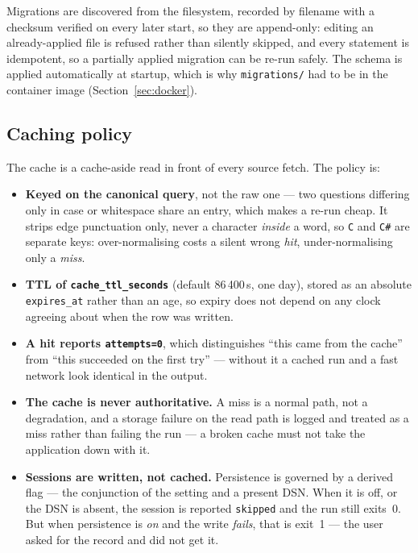 \documentclass[10pt,a4paper]{article}
\begin{document}
Migrations are discovered from the filesystem, recorded by filename with a checksum verified on
every later start, so they are append-only: editing an already-applied file is refused rather
than silently skipped, and every statement is idempotent, so a partially applied migration can be
re-run safely. The schema is applied automatically at
startup, which is why \texttt{migrations/} had to be in the container image
(Section~\ref{sec:docker}).

\subsection{Caching policy}

The cache is a cache-aside read in front of every source fetch. The policy is:

\begin{itemize}[leftmargin=1.4em,itemsep=0.15em]
  \item \textbf{Keyed on the canonical query}, not the raw one --- two questions differing only
        in case or whitespace share an entry, which makes a re-run cheap. It strips edge
        punctuation only, never a character \emph{inside} a word, so \texttt{C} and \texttt{C\#}
        are separate keys: over-normalising costs a silent wrong \emph{hit}, under-normalising
        only a \emph{miss}.
  \item \textbf{TTL of \texttt{cache\_ttl\_seconds}} (default 86\,400\,s, one day), stored as an
        absolute \texttt{expires\_at} rather than an age, so expiry does not depend on any
        clock agreeing about when the row was written.
  \item \textbf{A hit reports \texttt{attempts=0}}, which distinguishes ``this came from the
        cache'' from ``this succeeded on the first try'' --- without it a cached run and a fast
        network look identical in the output.
  \item \textbf{The cache is never authoritative.} A miss is a normal path, not a degradation,
        and a storage failure on the read path is logged and treated as a miss rather than
        failing the run --- a broken cache must not take the application down with it.
  \item \textbf{Sessions are written, not cached.} Persistence is governed by a derived flag ---
        the conjunction of the setting and a present DSN. When it is off, or the DSN is absent,
        the session is reported \texttt{skipped} and the run still exits~0. But when persistence
        is \emph{on} and the write \emph{fails}, that is exit~1 --- the user asked for the record
        and did not get it.
\end{itemize}
\end{document}
